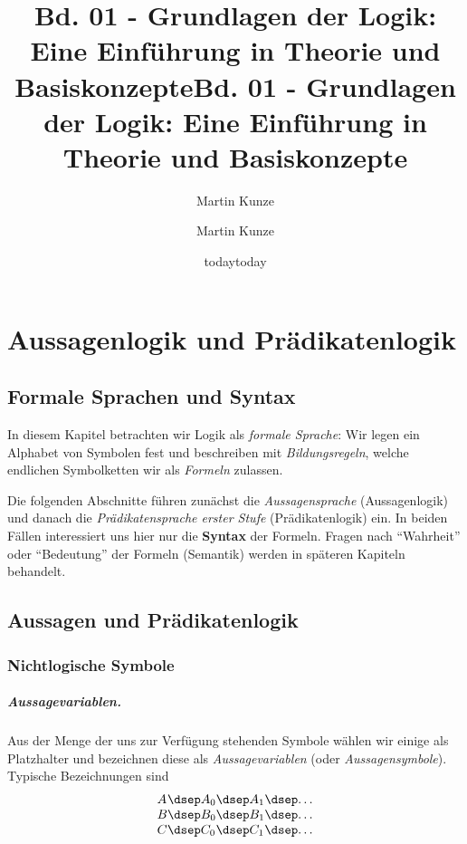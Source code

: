 \documentclass[main.tex]{subfiles}
\title{Bd. 01 - Grundlagen der Logik: Eine Einführung in Theorie und Basiskonzepte}
\author{Martin Kunze}
\date{today}
\begin{document}
\title{Bd. 01 - Grundlagen der Logik: Eine Einführung in Theorie und Basiskonzepte}
\author{Martin Kunze}
\date{today}
\hypersetup{pageanchor=false}
\maketitle
\hypersetup{pageanchor=true}
\tableofcontents
\raggedbottom
\setcounter{file}{1}
\renewcommand{\FormulaBandID}{1}

\chapter{Aussagenlogik und Prädikatenlogik}

\section{Formale Sprachen und Syntax}

In diesem Kapitel betrachten wir Logik als \emph{formale Sprache}:
Wir legen ein Alphabet von Symbolen fest und beschreiben mit
\emph{Bildungsregeln}, welche endlichen Symbolketten wir als
\emph{Formeln} zulassen. 

Die folgenden Abschnitte führen zunächst die \emph{Aussagensprache}
(Aussagenlogik) und danach die \emph{Prädikatensprache erster Stufe}
(Prädikatenlogik) ein. In beiden Fällen interessiert uns hier nur
die \textbf{Syntax} der Formeln. Fragen nach \enquote{Wahrheit} oder
\enquote{Bedeutung} der Formeln (Semantik) werden in späteren
Kapiteln behandelt.

\section{Aussagen und Prädikatenlogik}

\subsection{Nichtlogische Symbole}

\paragraph{Aussagevariablen.}
Aus der Menge der uns zur Verfügung stehenden Symbole wählen wir einige
als Platzhalter und bezeichnen diese als \emph{Aussagevariablen}
(oder \emph{Aussagensymbole}). Typische Bezeichnungen sind
\[
\begin{array}{l@{\dsep}l@{\dsep}l@{\dsep}l}
  A & A_0 & A_1 & \dots \\
  B & B_0 & B_1 & \dots \\
  C & C_0 & C_1 & \dots
\end{array}
\]
\end{document}
